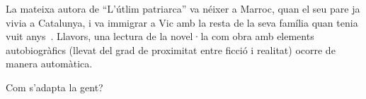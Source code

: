 La mateixa autora de ``L'útlim patriarca'' va néixer a Marroc, quan el seu pare ja vivia a Catalunya, i va immigrar a Vic amb la resta de la seva família quan tenia vuit anys~\autocite{Vidal2012}.
Llavors, una lectura de la novel·la com obra amb elements autobiogràfics (llevat del grad de proximitat entre ficció i realitat) ocorre de manera automàtica.

Com s'adapta la gent?


\begin{comment}

La població estrangera a Catalunya (APUNTS de prospectiva territorial, numero 2)

--> discuteix la població estrangera i el seu desenvolupament en el periode de 2000-2013
analitza la distribució territorial

"a partir de la dècada de 1980 es produexien diverses onades migratòries del nord d'Àfrica"
--> ich glaube, mein Roman faellt hier rein; nach meinen Berechnungen sind sie Anfang der 90ern nach Catalunya gekommen

"A Catalunya [...] El primer contigent són els africans (27.5\%), la gran majoria marroquins (20.4\% del total d'immigrants a Catalunya)."

"El col·lectiu procedent del Marroc ha estat el més important des dels inicis de la immigració estrangera recent a Catalunya, tant pel nombre com per la seva distribució en el territori."

"El marroquins, segon grup de la província, presenta una migració més masculina en els grups de més edat (majors de 35 anys), però equilibrada en les edat inferiors. Destaca especialment l'important volum de població infantil: el 14,6\% dels marroquins tenen menys de 5 anys."

relevància per a mi:
trets/dades històrics serveixen com a base per la història

------------------------

[Candel1965]

Els altres catalans

"On hi ha feina, hi són ells" (p.17)
"A la terra dels seus pares no hi ha feina" (p.17)
"Se senten conquistats per Catalunya; no del tot, és clar [...] si els diuen murcians o gallecs s'enfaden; si els diuen catalans, no" (p.17)
"Davant la persistent i discutida qüestió: "...heu vingut a menjar-vos el pa dels catalans..." es posen furiosos, naturalmen! i aleshores, només aleshores, malparlen de Catalunya. A ells no els el regala ningú, el pa; ells se'l suen;" (p.17)


\end{comment}
